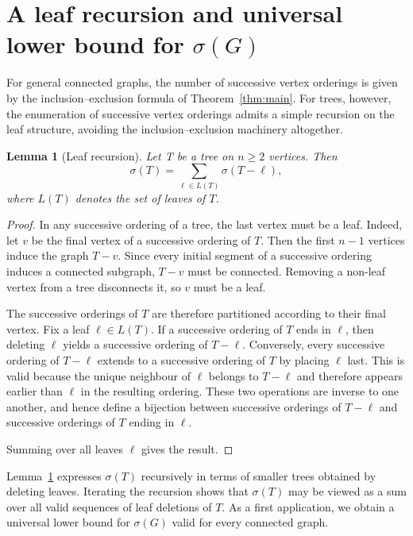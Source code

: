 \documentclass[11pt,a4paper]{article}
\numberwithin{equation}{section}
\theoremstyle{plain}
\newtheorem{lemma}[theorem]{Lemma}
\theoremstyle{definition}
\theoremstyle{remark}
\begin{document}
\section{A leaf recursion and universal lower bound for $\sigma(G)$}

For general connected graphs, the number of successive vertex orderings is given by the inclusion--exclusion formula of Theorem~\ref{thm:main}. For trees, however, the enumeration of successive vertex orderings admits a simple recursion on the leaf structure, avoiding the inclusion--exclusion machinery altogether.

\begin{lemma}[Leaf recursion]
\label{lem:leafrecursion}
Let T be a tree on $n\ge 2$ vertices. Then
\[
\sigma(T)=\sum_{\ell\in L(T)} \sigma(T-\ell),
\]
where \(L(T)\) denotes the set of leaves of \(T\).
\end{lemma}

\begin{proof}
In any successive ordering of a tree, the last vertex must be a leaf. Indeed, let \(v\) be the final vertex of a successive ordering of \(T\). Then the first \(n-1\) vertices induce the graph \(T-v\). Since every initial segment of a successive ordering induces a connected subgraph, \(T-v\) must be connected. Removing a non-leaf vertex from a tree disconnects it, so \(v\) must be a leaf.

The successive orderings of \(T\) are therefore partitioned according to their final vertex. Fix a leaf \(\ell\in L(T)\). If a successive ordering of \(T\) ends in \(\ell\), then deleting \(\ell\) yields a successive ordering of \(T-\ell\). Conversely, every successive ordering of \(T-\ell\) extends to a successive ordering of \(T\) by placing \(\ell\) last. This is valid because the unique neighbour of \(\ell\) belongs to \(T-\ell\) and therefore appears earlier than \(\ell\) in the resulting ordering. These two operations are inverse to one another, and hence define a bijection between successive orderings of \(T-\ell\) and successive orderings of \(T\) ending in \(\ell\).

Summing over all leaves \(\ell\) gives the result.
\end{proof}

Lemma~\ref{lem:leafrecursion} expresses \(\sigma(T)\) recursively in terms of smaller trees obtained by deleting leaves. Iterating the recursion shows that \(\sigma(T)\) may be viewed as a sum over all valid sequences of leaf deletions of \(T\). As a first application, we obtain a universal lower bound for \(\sigma(G)\) valid for every connected graph.
\end{document}
